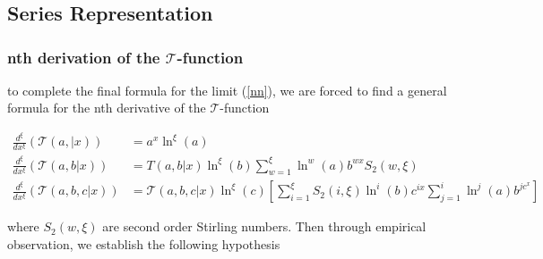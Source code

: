 
\section{}

\subsection{Series Representation}

\subsubsection{nth derivation of the \(\mathcal{T}\)-function }

to complete the final formula for the limit (\ref{nn}),
we are forced to find a general formula for the nth 
derivative of the \(\mathcal{T}\)-function

\begin{align}
        \frac{d^\xi}{dx^\xi}(\mathcal{T}(a,| x) ) & =a^x \ln^\xi(a)\\
        \frac{d^\xi}{dx^\xi}(\mathcal{T}(a, b | x) ) &= T(a, b |x) 
        \ln^\xi(b) \sum_{w=1}^\xi \ln^w(a) b^{wx} S_2(w, \xi) \\
        \frac{d^\xi}{dx^\xi}(\mathcal{T}(a, b, c | x) ) &= 
        \mathcal{T}(a, b, c | x) \ln^\xi(c) \left[ \sum_{i=1}^\xi 
        S_2(i, \xi) \ln^i(b)c^{ix} \sum_{j=1}^i \ln^j(a) b^{jc^x}\right]
\end{align}

where \(S_2(w, \xi)\) are second order Stirling numbers. 
Then through empirical observation, we establish the following 
hypothesis

